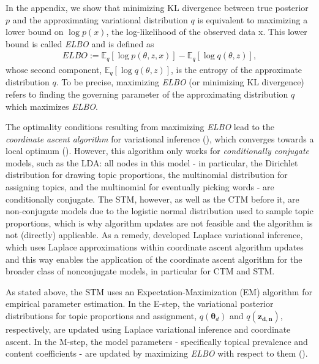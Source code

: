 In the appendix, we show that minimizing KL divergence between true posterior $p$ and the approximating variational distribution $q$ is equivalent to maximizing a lower bound on $\log p(x)$, the log-likelihood of the observed data x. This lower bound is called \textit{ELBO} and is defined as
\begin{align*}
ELBO := \mathbb{E}_q[\log p(\theta,z,x)] - \mathbb{E}_q[\log q(\theta,z)],
\end{align*}
whose second component, $\mathbb{E}_q[\log q(\theta,z)]$, is the entropy of the approximate distribution $q$. To be precise, maximizing \textit{ELBO} (or minimizing KL divergence) refers to finding the governing parameter of the approximating distribution $q$ which maximizes \textit{ELBO}.

The optimality conditions resulting from maximizing \textit{ELBO} lead to the \textit{coordinate ascent algorithm} for variational inference (\citealp{wang2013variational}), which converges towards a local optimum (\citealp{bishop2006pattern}). However, this algorithm only works for \textit{conditionally conjugate} models, such as the LDA: all nodes in this model - in particular, the Dirichlet distribution for drawing topic proportions, the multinomial distribution for assigning topics, and the multinomial for eventually picking words - are conditionally conjugate. The STM, however, as well as the CTM before it, are non-conjugate models due to the logistic normal distribution used to sample topic proportions, which is why algorithm updates are not feasible and the algorithm is not (directly) applicable. As a remedy, \cite{wang2013variational} developed Laplace variational inference, which uses Laplace approximations within coordinate ascent algorithm updates and this way enables the application of the coordinate ascent algorithm for the broader class of nonconjugate models, in particular for CTM and STM.

As stated above, the STM uses an Expectation-Maximization (EM) algorithm for empirical parameter estimation. In the E-step, the variational posterior distributions for topic proportions and assignment, $q(\boldsymbol{\theta}_d)$ and $q(\boldsymbol{z_{d,n}})$, respectively, are updated using Laplace variational inference and coordinate ascent. In the M-step, the model parameters - specifically topical prevalence and content coefficients - are updated by maximizing \textit{ELBO} with respect to them (\citealp{roberts2016model}).